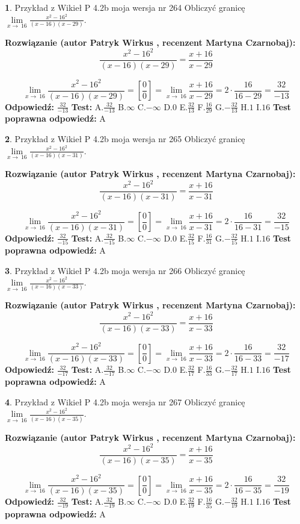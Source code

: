 \documentclass[12pt, a4paper]{article}
\theoremstyle{definition} %
\newtheorem{zad}{}
\newcommand{\zadStart}[1]{\begin{zad}#1\newline}
\newcommand{\zadStop}{\end{zad}}
\newcommand{\rozwStart}[2]{\noindent \textbf{Rozwiązanie (autor #1 , recenzent #2): }\newline}
\newcommand{\rozwStop}{\newline}
\newcommand{\odpStart}{\noindent \textbf{Odpowiedź:}\newline}
\newcommand{\odpStop}{\newline}
\newcommand{\testStart}{\noindent \textbf{Test:}\newline}
\newcommand{\testStop}{\newline}
\newcommand{\kluczStart}{\noindent \textbf{Test poprawna odpowiedź:}\newline}
\newcommand{\kluczStop}{\newline}
\begin{document}
\zadStart{Przykład z Wikieł P 4.2b moja wersja nr 264}
Obliczyć granicę $\lim\limits_{x\to\ 16}\frac{x^{2}-16^{2}}{(x-16)(x-29)}$.
\zadStop
\rozwStart{Patryk Wirkus}{Martyna Czarnobaj}
$$\frac{x^{2}-16^{2}}{(x-16)(x-29)}=\frac{x+16}{x-29}$$

$$\lim\limits_{x\to\ 16}\frac{x^{2}-16^{2}}{(x-16)(x-29)}=[\frac{0}{0}]=\lim\limits_{x\to\ 16}\frac{x+16}{x-29}=2 \cdot \frac{16}{16-29} = \frac{32}{-13}$$
\rozwStop
\odpStart
$\frac{32}{-13}$
\odpStop
\testStart
A.$\frac{32}{-13}$
B.$\infty$
C.$-\infty$
D.$0$
E.$\frac{32}{13}$
F.$\frac{16}{29}$
G.$-\frac{32}{13}$
H.$1$
I.$16$
\testStop
\kluczStart
A
\kluczStop



\zadStart{Przykład z Wikieł P 4.2b moja wersja nr 265}
Obliczyć granicę $\lim\limits_{x\to\ 16}\frac{x^{2}-16^{2}}{(x-16)(x-31)}$.
\zadStop
\rozwStart{Patryk Wirkus}{Martyna Czarnobaj}
$$\frac{x^{2}-16^{2}}{(x-16)(x-31)}=\frac{x+16}{x-31}$$

$$\lim\limits_{x\to\ 16}\frac{x^{2}-16^{2}}{(x-16)(x-31)}=[\frac{0}{0}]=\lim\limits_{x\to\ 16}\frac{x+16}{x-31}=2 \cdot \frac{16}{16-31} = \frac{32}{-15}$$
\rozwStop
\odpStart
$\frac{32}{-15}$
\odpStop
\testStart
A.$\frac{32}{-15}$
B.$\infty$
C.$-\infty$
D.$0$
E.$\frac{32}{15}$
F.$\frac{16}{31}$
G.$-\frac{32}{15}$
H.$1$
I.$16$
\testStop
\kluczStart
A
\kluczStop



\zadStart{Przykład z Wikieł P 4.2b moja wersja nr 266}
Obliczyć granicę $\lim\limits_{x\to\ 16}\frac{x^{2}-16^{2}}{(x-16)(x-33)}$.
\zadStop
\rozwStart{Patryk Wirkus}{Martyna Czarnobaj}
$$\frac{x^{2}-16^{2}}{(x-16)(x-33)}=\frac{x+16}{x-33}$$

$$\lim\limits_{x\to\ 16}\frac{x^{2}-16^{2}}{(x-16)(x-33)}=[\frac{0}{0}]=\lim\limits_{x\to\ 16}\frac{x+16}{x-33}=2 \cdot \frac{16}{16-33} = \frac{32}{-17}$$
\rozwStop
\odpStart
$\frac{32}{-17}$
\odpStop
\testStart
A.$\frac{32}{-17}$
B.$\infty$
C.$-\infty$
D.$0$
E.$\frac{32}{17}$
F.$\frac{16}{33}$
G.$-\frac{32}{17}$
H.$1$
I.$16$
\testStop
\kluczStart
A
\kluczStop



\zadStart{Przykład z Wikieł P 4.2b moja wersja nr 267}
Obliczyć granicę $\lim\limits_{x\to\ 16}\frac{x^{2}-16^{2}}{(x-16)(x-35)}$.
\zadStop
\rozwStart{Patryk Wirkus}{Martyna Czarnobaj}
$$\frac{x^{2}-16^{2}}{(x-16)(x-35)}=\frac{x+16}{x-35}$$

$$\lim\limits_{x\to\ 16}\frac{x^{2}-16^{2}}{(x-16)(x-35)}=[\frac{0}{0}]=\lim\limits_{x\to\ 16}\frac{x+16}{x-35}=2 \cdot \frac{16}{16-35} = \frac{32}{-19}$$
\rozwStop
\odpStart
$\frac{32}{-19}$
\odpStop
\testStart
A.$\frac{32}{-19}$
B.$\infty$
C.$-\infty$
D.$0$
E.$\frac{32}{19}$
F.$\frac{16}{35}$
G.$-\frac{32}{19}$
H.$1$
I.$16$
\testStop
\kluczStart
A
\kluczStop
\end{document}
